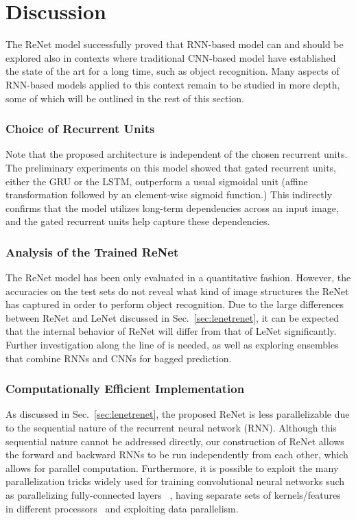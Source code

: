 \section{Discussion}

The ReNet model successfully proved that RNN-based model can and should be
explored also in contexts where traditional CNN-based model have established
the state of the art for a long time, such as object recognition. Many aspects
of RNN-based models applied to this context remain to be studied in more depth,
some of which will be outlined in the rest of this section.

\subsubsection{Choice of Recurrent Units}
Note that the proposed architecture is independent of the chosen recurrent
units. The preliminary experiments on this model showed that gated recurrent
units, either the GRU or the LSTM, outperform a usual sigmoidal unit (affine
transformation followed by an element-wise sigmoid function.) This indirectly
confirms that the model utilizes long-term dependencies across an input image,
and the gated recurrent units help capture these dependencies.

\subsubsection{Analysis of the Trained ReNet}
The ReNet model has been only evaluated in a quantitative fashion. However, the
accuracies on the test sets do not reveal what kind of image structures the
ReNet has captured in order to perform object recognition. Due to the large
differences between ReNet and LeNet discussed in Sec.~\ref{sec:lenetrenet}, it
can be expected that the internal behavior of ReNet will differ from that of
LeNet significantly. Further investigation along the line of
\citep{ZeilerFergus14} is needed, as well as exploring ensembles that combine
RNNs and CNNs for bagged prediction.

\subsubsection{Computationally Efficient Implementation}
As discussed in Sec.~\ref{sec:lenetrenet}, the proposed ReNet is less
parallelizable due to the sequential nature of the recurrent neural network
(RNN). Although this sequential nature cannot be addressed directly, our
construction of ReNet allows the forward and backward RNNs to be run
independently from each other, which allows for parallel computation.
Furthermore, it is possible to exploit the many parallelization tricks widely
used for training convolutional neural networks such as parallelizing
fully-connected layers ~\citep{krizhevsky2014one}, having separate sets of
kernels/features in different processors~\citep{Krizhevsky-2012} and exploiting
data parallelism.
